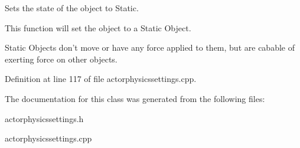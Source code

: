 Sets the state of the object to Static. 

This function will set the object to a Static Object. \par
 Static Objects don't move or have any force applied to them, but are cabable of exerting force on other objects. 

Definition at line 117 of file actorphysicssettings.cpp.



The documentation for this class was generated from the following files:\begin{DoxyCompactItemize}
\item 
actorphysicssettings.h\item 
actorphysicssettings.cpp\end{DoxyCompactItemize}
